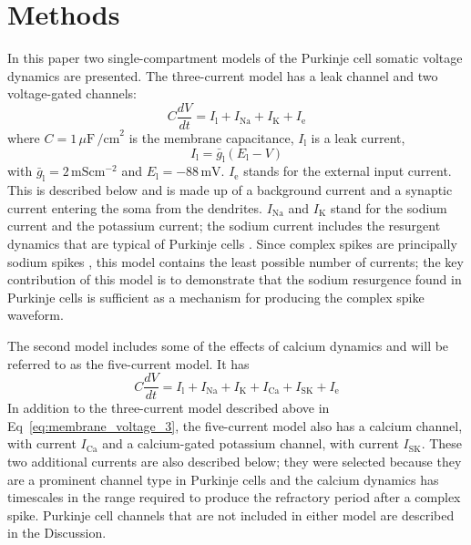 \documentclass[twocolumn]{svjour3}          %
\newcommand{\mv}{\,\mathrm{mV}}
\newcommand{\msi}{\,\mathrm{mS cm^{-2}}}
\renewcommand{\k}{\mathrm{K}}
\newcommand{\ca}{\mathrm{Ca}}
\newcommand{\na}{\mathrm{Na}}
\newcommand{\sk}{\mathrm{SK}}
\newcommand{\leak}{\mathrm{l}}
\begin{document}
\section{Methods}



In this paper two single-compartment models of the Purkinje cell
somatic voltage dynamics are presented. The three-current model has a
leak channel and two voltage-gated channels:
\begin{equation}
\label{eq:membrane_voltage_3}
C\frac{dV}{dt} =I_\leak+I_{\na}+I_\k+I_{\mathrm{e}}
\end{equation}
where $C = 1\,\mu\mathrm{F}\,\mathrm{\slash cm}^{2}$ is the membrane capacitance,
$I_{\leak}$ is a leak current,
\begin{equation}
\label{eq:I_L}
I_{\leak} =\bar{g}_{\leak}(E_\leak-V)
\end{equation}
with $\bar{g}_{\leak} = 2\msi$ and
$E_{\leak}=-88\mv$. $I_{\mathrm{e}}$ stands for the external input
current. This is described below and is made up of a background
current and a synaptic current entering the soma from the
dendrites. $I_{\na}$ and $I_{\k}$ stand for the sodium current and the
potassium current; the sodium current includes the resurgent dynamics
that are typical of Purkinje cells
\citep{RamanBean1997,RamanBean2001,KhaliqEtAl2003,KhaliqRaman2006}. Since
complex spikes are principally sodium spikes
\citep{StuartHausser1994}, this model contains the least possible
number of currents; the key contribution of this model is to
demonstrate that the sodium resurgence found in Purkinje cells is
sufficient as a mechanism for producing the complex spike waveform.

The second model includes some of the effects of calcium dynamics and
will be referred to as the five-current model. It has
\begin{equation}
\label{eq:membrane_voltage_5}
C\frac{dV}{dt} =I_{\leak}+I_{\na}+I_\k+I_\ca+I_\sk+I_{\mathrm{e}}
\end{equation}
In addition to the three-current model described above in
Eq~\ref{eq:membrane_voltage_3}, the five-current model also has a
calcium channel, with current $I_\ca$ and a calcium-gated potassium
channel, with current $I_\sk$. These two additional currents are also
described below; they were selected because they are a prominent
channel type in Purkinje cells and the calcium dynamics has timescales
in the range required to produce the refractory period after a complex
spike. Purkinje cell channels that are not included in either model
are described in the Discussion.
\end{document}
